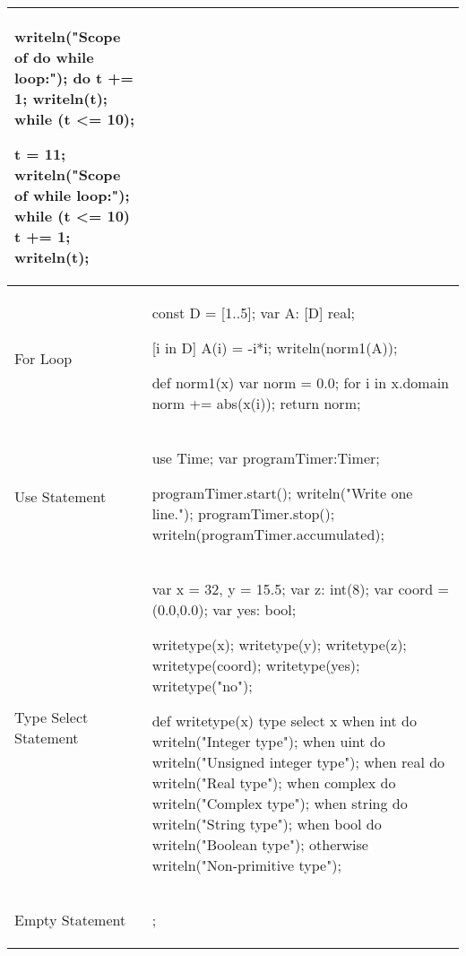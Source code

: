 \begin{center}
\begin{longtable}{|l|l|}
\begin{chapel}
writeln("Scope of do while loop:");
do {
  t += 1;
  writeln(t);
} while (t <= 10);

t = 11;
writeln("Scope of while loop:");
while (t <= 10) {
  t += 1;
  writeln(t);
}
\end{chapel} \\
\hline
For Loop &
\begin{chapel} %
const D = [1..5];
var A: [D] real;

[i in D] A(i) = -i*i;
writeln(norm1(A));

def norm1(x) {
  var norm = 0.0;
  for i in x.domain {
    norm += abs(x(i));
  }
  return norm;
}
\end{chapel} \\
\hline
Use Statement &
\begin{chapel} %
use Time;
var programTimer:Timer;

programTimer.start();
writeln("Write one line.");
programTimer.stop();
writeln(programTimer.accumulated);
\end{chapel} \\
\hline
Type Select Statement &
\begin{chapel} %
var x = 32, y = 15.5;
var z: int(8);
var coord = (0.0,0.0);
var yes: bool;

writetype(x);
writetype(y);
writetype(z);
writetype(coord);
writetype(yes);
writetype("no");

def writetype(x) {
  type select x {
    when int do writeln("Integer type");
    when uint do writeln("Unsigned integer type");
    when real do writeln("Real type");
    when complex do writeln("Complex type");
    when string do writeln("String type");
    when bool do writeln("Boolean type");
    otherwise writeln("Non-primitive type");
  }
}
\end{chapel} \\
\hline
Empty Statement &
\begin{chapel}
;
\end{chapel} \\
\hline
\end{longtable}
\end{center}

